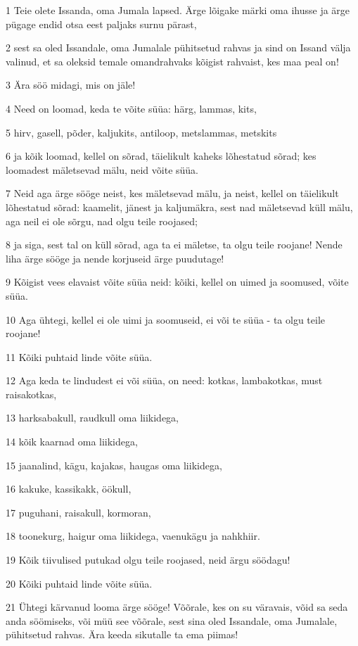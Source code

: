 \par 1 Teie olete Issanda, oma Jumala lapsed. Ärge lõigake märki oma ihusse ja ärge pügage endid otsa eest paljaks surnu pärast,
\par 2 sest sa oled Issandale, oma Jumalale pühitsetud rahvas ja sind on Issand välja valinud, et sa oleksid temale omandrahvaks kõigist rahvaist, kes maa peal on!
\par 3 Ära söö midagi, mis on jäle!
\par 4 Need on loomad, keda te võite süüa: härg, lammas, kits,
\par 5 hirv, gasell, põder, kaljukits, antiloop, metslammas, metskits
\par 6 ja kõik loomad, kellel on sõrad, täielikult kaheks lõhestatud sõrad; kes loomadest mäletsevad mälu, neid võite süüa.
\par 7 Neid aga ärge sööge neist, kes mäletsevad mälu, ja neist, kellel on täielikult lõhestatud sõrad: kaamelit, jänest ja kaljumäkra, sest nad mäletsevad küll mälu, aga neil ei ole sõrgu, nad olgu teile roojased;
\par 8 ja siga, sest tal on küll sõrad, aga ta ei mäletse, ta olgu teile roojane! Nende liha ärge sööge ja nende korjuseid ärge puudutage!
\par 9 Kõigist vees elavaist võite süüa neid: kõiki, kellel on uimed ja soomused, võite süüa.
\par 10 Aga ühtegi, kellel ei ole uimi ja soomuseid, ei või te süüa - ta olgu teile roojane!
\par 11 Kõiki puhtaid linde võite süüa.
\par 12 Aga keda te lindudest ei või süüa, on need: kotkas, lambakotkas, must raisakotkas,
\par 13 harksabakull, raudkull oma liikidega,
\par 14 kõik kaarnad oma liikidega,
\par 15 jaanalind, kägu, kajakas, haugas oma liikidega,
\par 16 kakuke, kassikakk, öökull,
\par 17 puguhani, raisakull, kormoran,
\par 18 toonekurg, haigur oma liikidega, vaenukägu ja nahkhiir.
\par 19 Kõik tiivulised putukad olgu teile roojased, neid ärgu söödagu!
\par 20 Kõiki puhtaid linde võite süüa.
\par 21 Ühtegi kärvanud looma ärge sööge! Võõrale, kes on su väravais, võid sa seda anda söömiseks, või müü see võõrale, sest sina oled Issandale, oma Jumalale, pühitsetud rahvas. Ära keeda sikutalle ta ema piimas!
